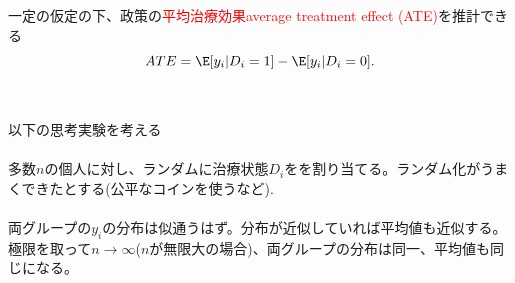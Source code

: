 \begin{frame}{}
一定の仮定の下、政策の\textcolor{red}{平均治療効果average treatment effect (ATE)}を推計できる
\[
ATE=\E[y_{i}|D_{i}=1]-\E[y_{i}|D_{i}=0].
\]
\\~\\
\pause
以下の思考実験を考える\\~\\

多数$n$の個人に対し、ランダムに治療状態$D_{i}$をを割り当てる。ランダム化がうまくできたとする(公平なコインを使うなど).\\~\\

両グループの$y_{i}$の分布は似通うはず。分布が近似していれば平均値も近似する。極限を取って$n\rightarrow\infty$($n$が無限大の場合)、両グループの分布は同一、平均値も同じになる。\\~\\
\end{frame}

